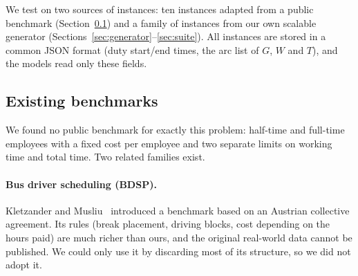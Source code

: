 
We test on two sources of instances: ten instances adapted from a public
benchmark (Section~\ref{sec:orlib}) and a family of instances from our own
scalable generator (Sections~\ref{sec:generator}--\ref{sec:suite}). All
instances are stored in a common JSON format (duty start/end times, the arc
list of $G$, $W$ and $T$), and the models read only these fields.

\subsection{Existing benchmarks}
\label{sec:orlib}

We found no public benchmark for exactly this problem: half-time and
full-time employees with a fixed cost per employee and two separate limits on
working time and total time. Two related families exist.

\paragraph{Bus driver scheduling (BDSP).} Kletzander and
Musliu~\cite{kletzander2020} introduced a benchmark based on an Austrian
collective agreement. Its rules (break placement, driving blocks, cost
depending on the hours paid) are much richer than ours, and the original
real-world data cannot be published. We could only use it by discarding most
of its structure, so we did not adopt it.


